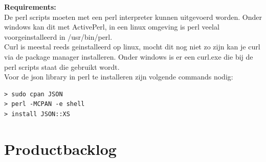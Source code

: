 \documentclass[a4paper]{article}
\begin{document}
\textbf{Requirements:} \\
De perl scripts moeten met een perl interpreter kunnen uitgevoerd worden. Onder windows kan dit met ActivePerl, in een linux omgeving is perl veelal voorgeinstalleerd in /usr/bin/perl. \\

Curl is meestal reeds geinstalleerd op linux, mocht dit nog niet zo zijn kan je curl via de package manager installeren. Onder windows is er een curl.exe die bij de perl scripts staat die gebruikt wordt. \\

Voor de json library in perl te installeren zijn volgende commands nodig: \\

\begin{lstlisting}
> sudo cpan JSON
> perl -MCPAN -e shell
> install JSON::XS
\end{lstlisting}

\section{Productbacklog}
\label{sec:productbacklog}

\end{document}
